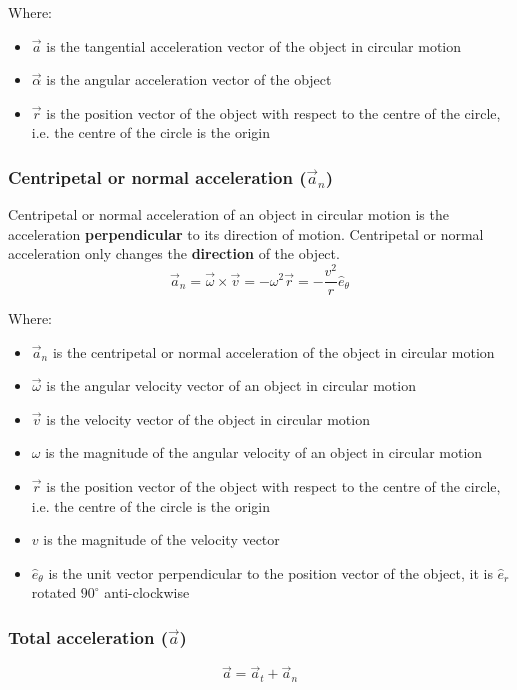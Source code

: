 \documentclass[11pt]{article}
\begin{document}
Where:
\begin{itemize}
\item \(\vec{a}\) is the tangential acceleration vector of the object in circular motion
\item \(\vec{\alpha}\) is the angular acceleration vector of the object
\item \(\vec{r}\) is the position vector of the object with respect to the centre of the circle, i.e. the centre of the circle is the origin
\end{itemize}

 \newpage

\subsubsection{Centripetal or normal acceleration (\(\vec{a}_n\))}
\label{sec:org0ee6996}
Centripetal or normal acceleration of an object in circular motion is the acceleration \textbf{perpendicular} to its direction of motion. Centripetal or normal acceleration only changes the \textbf{direction} of the object.
\[\vec{a}_n = \vec{\omega} \times \vec{v} = - \omega^2 \vec{r} = - \frac{v^2}{r} \hat{e}_{\theta}\]

Where:
\begin{itemize}
\item \(\vec{a}_n\) is the centripetal or normal acceleration of the object in circular motion
\item \(\vec{\omega}\) is the angular velocity vector of an object in circular motion
\item \(\vec{v}\) is the velocity vector of the object in circular motion
\item \(\omega\) is the magnitude of the angular velocity of an object in circular motion
\item \(\vec{r}\) is the position vector of the object with respect to the centre of the circle, i.e. the centre of the circle is the origin
\item \(v\) is the magnitude of the velocity vector
\item \(\hat{e}_{\theta}\) is the unit vector perpendicular to the position vector of the object, it is \(\hat{e}_r\) rotated \(90^{\circ}\) anti-clockwise
\end{itemize}

\subsubsection{Total acceleration (\(\vec{a}\))}
\label{sec:orgcd4efcb}
\[\vec{a} = \vec{a}_t + \vec{a}_n\]
\end{document}
